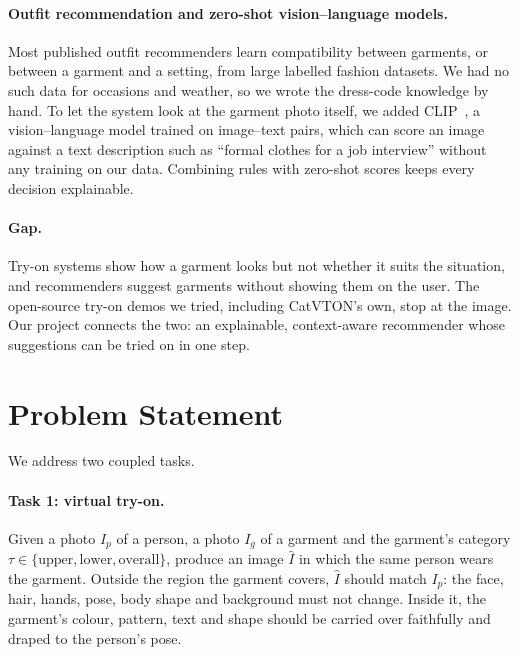 \documentclass{article}
\begin{document}
\paragraph{Outfit recommendation and zero-shot vision--language models.}
Most published outfit recommenders learn compatibility between garments, or between a garment and a
setting, from large labelled fashion datasets. We had no such data for occasions and weather, so we
wrote the dress-code knowledge by hand. To let the system look at the garment photo itself, we added
CLIP~\cite{clip}, a vision--language model trained on image--text pairs, which can score an image
against a text description such as ``formal clothes for a job interview'' without any training on our
data. Combining rules with zero-shot scores keeps every decision explainable.

\paragraph{Gap.} Try-on systems show how a garment looks but not whether it suits the situation, and
recommenders suggest garments without showing them on the user. The open-source try-on demos we tried,
including CatVTON's own, stop at the image. Our project connects the two: an explainable,
context-aware recommender whose suggestions can be tried on in one step.

\section{Problem Statement}
\label{sec:problem}

We address two coupled tasks.

\paragraph{Task 1: virtual try-on.} Given a photo $I_p$ of a person, a photo $I_g$ of a garment and the
garment's category $\tau\in\{\text{upper},\text{lower},\text{overall}\}$, produce an image $\hat I$ in which
the same person wears the garment. Outside the region the garment covers, $\hat I$ should match $I_p$:
the face, hair, hands, pose, body shape and background must not change. Inside it, the garment's colour,
pattern, text and shape should be carried over faithfully and draped to the person's pose.
\end{document}

